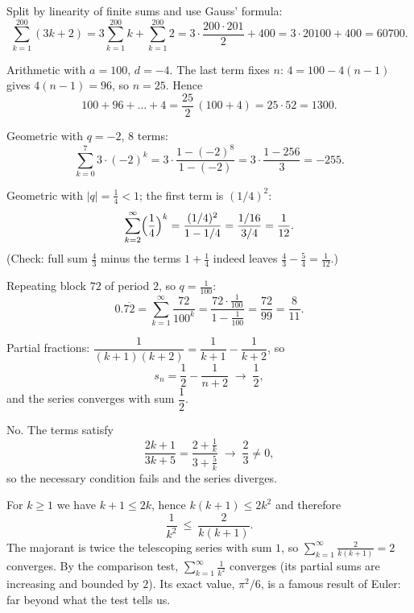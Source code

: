 \begin{solutions}
  \item Split by linearity of finite sums and use Gauss' formula:
        \[
          \sum_{k=1}^{200}(3k+2)
          =3\sum_{k=1}^{200}k+\sum_{k=1}^{200}2
          =3\cdot\frac{200\cdot 201}{2}+400
          =3\cdot 20100+400=60700 .
        \]

  \item Arithmetic with $a=100$, $d=-4$. The last term fixes $n$:
        $4=100-4(n-1)$ gives $4(n-1)=96$, so $n=25$. Hence
        \[
          100+96+\dots+4=\frac{25}{2}\,(100+4)=25\cdot 52=1300 .
        \]

  \item Geometric with $q=-2$, $8$ terms:
        \[
          \sum_{k=0}^{7}3\cdot(-2)^{k}
          =3\cdot\frac{1-(-2)^{8}}{1-(-2)}
          =3\cdot\frac{1-256}{3}=-255 .
        \]

  \item Geometric with $|q|=\tfrac14<1$; the first term is $(1/4)^{2}$:
        \[
          \sum_{k=2}^{\infty}\Bigl(\frac14\Bigr)^{k}
          =\frac{(1/4)^{2}}{1-1/4}
          =\frac{1/16}{3/4}=\frac{1}{12} .
        \]
        (Check: full sum $\tfrac{4}{3}$ minus the terms $1+\tfrac14$
        indeed leaves $\tfrac{4}{3}-\tfrac{5}{4}=\tfrac{1}{12}$.)

  \item Repeating block $72$ of period $2$, so $q=\tfrac{1}{100}$:
        \[
          0.\overline{72}
          =\sum_{k=1}^{\infty}\frac{72}{100^{k}}
          =\frac{72\cdot\tfrac{1}{100}}{1-\tfrac{1}{100}}
          =\frac{72}{99}=\frac{8}{11} .
        \]

  \item Partial fractions:
        $\dfrac{1}{(k+1)(k+2)}=\dfrac{1}{k+1}-\dfrac{1}{k+2}$, so
        \[
          s_n=\frac12-\frac{1}{n+2}\;\longrightarrow\;\frac12 ,
        \]
        and the series converges with sum $\dfrac12$.

  \item No. The terms satisfy
        \[
          \frac{2k+1}{3k+5}
          =\frac{2+\tfrac{1}{k}}{3+\tfrac{5}{k}}
          \;\longrightarrow\;\frac{2}{3}\neq 0 ,
        \]
        so the necessary condition fails and the series diverges.

  \item For $k\ge 1$ we have $k+1\le 2k$, hence $k(k+1)\le 2k^{2}$ and
        therefore
        \[
          \frac{1}{k^{2}}\ \le\ \frac{2}{k(k+1)} .
        \]
        The majorant is twice the telescoping series with sum $1$, so
        $\sum_{k=1}^{\infty}\tfrac{2}{k(k+1)}=2$ converges. By the
        comparison test, $\displaystyle\sum_{k=1}^{\infty}\frac{1}{k^{2}}$
        converges (its partial sums are increasing and bounded by $2$).
        Its exact value, $\pi^{2}/6$, is a famous result of Euler: far
        beyond what the test tells us.


\end{solutions}
